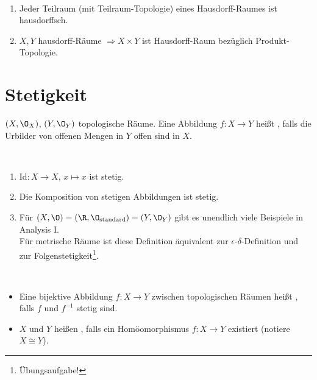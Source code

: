 \begin{remark}
  \
  \begin{enumerate}
    \item Jeder Teilraum (mit Teilraum-Topologie) eines Hausdorff-Raumes ist hausdorffsch. 
    \item \( X, Y \) hausdorff-Räume \( \Rightarrow X \times Y \) ist Hausdorff-Raum bezüglich Produkt-Topologie.
  \end{enumerate}
\end{remark}

\section{Stetigkeit}

\begin{definition}[Stetigkeit]\label{def:stetig}
  \( (X, \O_X) \), \( (Y, \O_Y) \) topologische Räume. Eine Abbildung \( f : X \to Y \) heißt , falls die Urbilder von offenen Mengen in \( Y \) offen sind in \( X \).
\end{definition}

\begin{example}
  \
  \begin{enumerate}
    \item \( \text{Id}: X \to X \), \( x \mapsto x \) ist stetig.
    \item Die Komposition von stetigen Abbildungen ist stetig.
    \item Für \( (X, \O) = (\R, \O_\text{standard}) = (Y, \O_Y) \) gibt es unendlich viele Beispiele in Analysis I. \\
    Für metrische Räume ist diese Definition äquivalent zur \( \epsilon \)-\( \delta \)-Definition und zur Folgenstetigkeit\footnote{Übungsaufgabe!}.
  \end{enumerate}
\end{example}

\begin{definition}[Homöomorphismus]\label{def:homoeomorphismus} \
  \begin{itemize}
    \item Eine bijektive Abbildung \( f: X \to Y \) zwischen topologischen Räumen heißt , falls \( f \) und \( f^{-1} \) stetig sind.
    \item \( X \) und \( Y \) heißen \term{homöomorph}, falls ein Homöomorphismus \( f: X \to Y \) existiert (notiere \( X \cong Y \)). 
  \end{itemize}
\end{definition}

